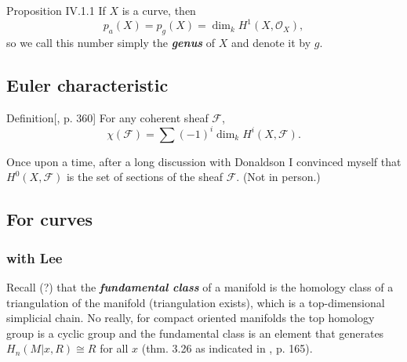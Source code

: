 \begin{thing4}{Proposition IV.1.1}\label{prop:IV.1.1}\leavevmode
If \(X\) is a curve, then
\[p_a(X)=p_g(X)=\dim_kH^{1}(X,\mathcal{O}_X),\]
so we call this number simply the \textit{\textbf{genus}} of \(X\) and denote it by \(g\).
\end{thing4}

\subsection{Euler characteristic}

\begin{thing4}{Definition}[\cite{hart}, p. 360]\label{def:}\leavevmode
For any coherent sheaf \(\mathcal{F}\),
\[\chi(\mathcal{F})=\sum(-1)^i\dim_kH^{i}(X,\mathcal{F}).\]
\end{thing4}

\begin{remark}\leavevmode
Once upon a time, after a long discussion with Donaldson I convinced myself that \(H^{0}(X,\mathcal{F})\) is the set of sections of the sheaf \(\mathcal{F}\). (Not in person.)
\end{remark}

\subsection{For curves}

\subsubsection{with Lee}

Recall (?) that the \textit{\textbf{fundamental class}} of a manifold is the homology class of a triangulation of the manifold (triangulation exists), which is a top-dimensional simplicial chain. No really, for compact oriented manifolds the top homology group is a cyclic group and the fundamental class is an element that generates \(H_n(M|x,R)\cong R\) for all \(x\) (thm. 3.26 \cite{hat} as indicated in \cite{lec}, p. 165).

